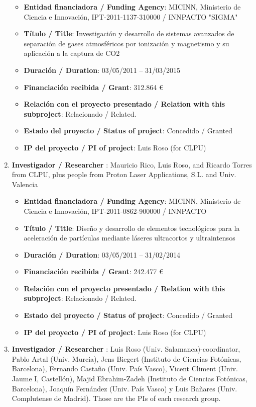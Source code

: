 \begin{enumerate}
\begin{itemize}
	\item {\bf Entidad financiadora / Funding Agency}: MICINN, Ministerio de Ciencia e Innovaci\'on, IPT-2011-1137-310000  / INNPACTO "SIGMA"
	\item {\bf Título / Title}: Investigaci\'on y desarrollo de sistemas avanzados de separaci\'on de gases atmosf\'ericos por ionizaci\'on y magnetismo y su aplicaci\'on a la captura de CO2
	\item {\bf Duración / Duration}: 03/05/2011 -- 31/03/2015
	\item {\bf Financiación recibida / Grant}: 312.864 \euro 
	\item {\bf Relación con el proyecto presentado / Relation with this subproject}: Relacionado / Related. 
	\item {\bf Estado del proyecto / Status of project}: Concedido / Granted
	\item {\bf IP del proyecto / PI of project}: Luis Roso (for CLPU)
\end{itemize}
\item {\bf Investigador / Researcher }: Mauricio Rico, Luis Roso, and Ricardo Torres from CLPU, plus people from Proton Laser Applications, S.L. and  Univ. Valencia
\begin{itemize}
	\item {\bf Entidad financiadora / Funding Agency}: MICINN, Ministerio de Ciencia e Innovaci\'on, IPT-2011-0862-900000     / INNPACTO
	\item {\bf Título / Title}: Dise\~no y desarrollo de elementos tecnol\'ogicos para la aceleraci\'on de part\'iculas mediante l\'aseres ultracortos y ultraintensos
	\item {\bf Duración / Duration}: 03/05/2011 -- 31/02/2014
	\item {\bf Financiación recibida / Grant}: 242.477 \euro 
	\item {\bf Relación con el proyecto presentado / Relation with this subproject}: Relacionado / Related. 
	\item {\bf Estado del proyecto / Status of project}: Concedido / Granted
	\item {\bf IP del proyecto / PI of project}: Luis Roso (for CLPU)
\end{itemize}
\item {\bf Investigador / Researcher }: Luis Roso (Univ. Salamanca)-coordinator, Pablo Artal (Univ. Murcia), Jens Biegert (Instituto de Ciencias Fot\'onicas, Barcelona), Fernando Castaño (Univ. Pa\'is Vasco), Vicent Climent (Univ. Jaume I, Castell\'on), Majid Ebrahim-Zadeh (Instituto de Ciencias Fot\'onicas, Barcelona), Joaqu\'in Fern\'andez (Univ. Pa\'is Vasco) y Luis Bañares (Univ. Complutense de Madrid). Those are the PIs of each research group.


\end{enumerate}
